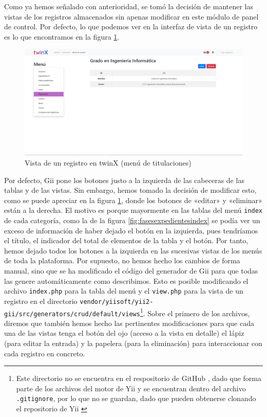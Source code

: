 Como ya hemos señalado con anterioridad, se tomó la decisión de mantener las vistas de los registros almacenados sin apenas modificar en este módulo de panel de control. Por defecto, lo que podemos ver en la interfaz de vista de un registro es lo que encontramos en la figura \ref{fig:vistatitulaciontwinX}.

\begin{figure}
	\centering
	\includegraphics[width=\textwidth]{img/Capturas de twinX/vista_titulacion}
	\caption[Vista de un registro en twinX]{Vista de un registro en twinX (menú de titulaciones)}
	\label{fig:vistatitulaciontwinX}
\end{figure}

Por defecto, Gii pone los botones justo a la izquierda de las cabeceras de las tablas y de las vistas. Sin embargo, hemos tomado la decisión de modificar esto, como se puede apreciar en la figura \ref{fig:vistatitulaciontwinX}, donde los botones de «editar» y «eliminar» están a la derecha. El motivo es porque mayormente en las tablas del menú \texttt{index} de cada categoría, como la de la figura \ref{fig:fasesexpedientesindex} se podía ver un exceso de información de haber dejado el botón en la izquierda, pues tendríamos el título, el indicador del total de elementos de la tabla y el botón. Por tanto, hemos dejado todos los botones a la izquierda en las sucesivas vistas de los menús de toda la plataforma. Por supuesto, no hemos hecho los cambios de forma manual, sino que se ha modificado el código del generador de Gii para que todas las genere automáticamente como describimos. Esto es posible modificando el archivo \texttt{index.php} para la tabla del menú y el \texttt{view.php} para la vista de un registro en el directorio \texttt{vendor/yiisoft/yii2-gii/src/generators/crud/default/views}\footnote{Este directorio no se encuentra en el respositorio de GitHub \cite{repogit}, dado que forma parte de los archivos del motor de Yii y se encuentran dentro del archivo \texttt{.gitignore}, por lo que no se guardan, dado que pueden obtenerse clonando el repositorio de Yii \cite{yii2advanced}}. Sobre el primero de los archivos, diremos que también hemos hecho las pertinentes modificaciones para que cada una de las vistas tenga el botón del ojo (acceso a la vista en detalle) el lápiz (para editar la entrada) y la papelera (para la eliminación) para interaccionar con cada registro en concreto.


